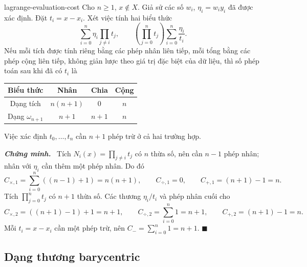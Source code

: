 \documentclass[12pt,a4paper,oneside]{book}
\numberwithin{algorithm}{chapter}
\theoremstyle{definition}
\newenvironment{chungminh}{\par\medskip\noindent\textbf{\textit{\color{mainblue}Chứng minh.}}\ }{\hfill$\blacksquare$\par\medskip}
\begin{document}
\begin{menhde}{}{lagrange-evaluation-cost}
Cho $n\geq1$, $x\notin X$. Giả sử các số $w_i$, $\eta_i=w_iy_i$ đã được xác định. Đặt $t_i=x-x_i$. Xét việc tính hai biểu thức
\[
 \sum_{i=0}^n\eta_i\prod_{j\ne i}t_j,
 \qquad
 \left(\prod_{j=0}^nt_j\right)\sum_{i=0}^n\frac{\eta_i}{t_i}.
\]
Nếu mỗi tích được tính riêng bằng các phép nhân liên tiếp, mỗi tổng bằng các phép cộng liên tiếp, không giản lược theo giá trị đặc biệt của dữ liệu, thì số phép toán sau khi đã có $t_i$ là
\begin{center}
\begin{tabular}{c|ccc}
\toprule
Biểu thức & Nhân & Chia & Cộng\\
\midrule
Dạng tích & $n(n+1)$ & $0$ & $n$\\
Dạng $\omega_{n+1}$ & $n+1$ & $n+1$ & $n$\\
\bottomrule
\end{tabular}
\end{center}
Việc xác định $t_0,\ldots,t_n$ cần $n+1$ phép trừ ở cả hai trường hợp.
\end{menhde}
\begin{chungminh}
Tích $N_i(x)=\prod_{j\ne i}t_j$ có $n$ thừa số, nên cần $n-1$ phép nhân; nhân với $\eta_i$ cần thêm một phép nhân. Do đó
\[
 C_{\times,1}=\sum_{i=0}^n((n-1)+1)=n(n+1),
 \qquad C_{\div,1}=0,\qquad C_{+,1}=(n+1)-1=n.
\]
Tích $\prod_{j=0}^nt_j$ có $n+1$ thừa số. Các thương $\eta_i/t_i$ và phép nhân cuối cho
\[
 C_{\times,2}=((n+1)-1)+1=n+1,
 \qquad C_{\div,2}=\sum_{i=0}^n1=n+1,
 \qquad C_{+,2}=(n+1)-1=n.
\]
Mỗi $t_i=x-x_i$ cần một phép trừ, nên $C_- =\sum_{i=0}^n1=n+1$.
\end{chungminh}

\subsection{Dạng thương barycentric}
\end{document}
